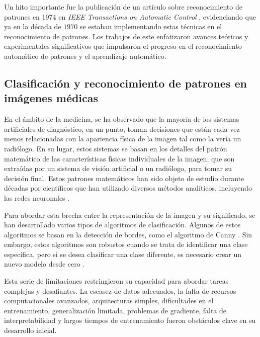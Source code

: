 Un hito importante fue la publicación de un artículo sobre reconocimiento de patrones en 1974 en \textit{IEEE Transactions on Automatic Control} , evidenciando que ya en la década de $1970$ se estaban implementando estas técnicas en el reconocimiento de patrones. Los trabajos de este enfatizaron avances teóricos y experimentales significativos que impulsaron el progreso en el reconocimiento automático de patrones y el aprendizaje automático.

\subsection{Clasificación y reconocimiento de patrones en imágenes médicas}  

En el ámbito de la medicina, se ha observado que la mayoría de los sistemas artificiales de diagnóstico, en un punto, toman decisiones que están cada vez menos relacionadas con la apariencia física de la imagen tal como la vería un radiólogo. En su lugar, estos sistemas se basan en los detalles del patrón matemático de las características físicas individuales de la imagen, que son extraídas por un sistema de visión artificial o un radiólogo, para tomar su decisión final. Estos patrones matemáticos han sido objeto de estudio durante décadas por científicos que han utilizado diversos métodos analíticos, incluyendo las redes neuronales .

Para abordar esta brecha entre la representación de la imagen y su significado, se han desarrollado varios tipos de algoritmos de clasificación. Algunos de estos algoritmos se basan en la detección de bordes, como el algoritmo de Canny . Sin embargo, estos algoritmos son robustos cuando se trata de identificar una clase específica, pero si se desea clasificar una clase diferente, es necesario crear un nuevo modelo desde cero .

Esta serie de limitaciones restringieron su capacidad para abordar tareas complejas y desafiantes. La escasez de datos adecuados, la falta de recursos computacionales avanzados, arquitecturas simples, dificultades en el entrenamiento, generalización limitada, problemas de gradiente, falta de interpretabilidad y largos tiempos de entrenamiento fueron obstáculos clave en su desarrollo inicial.

